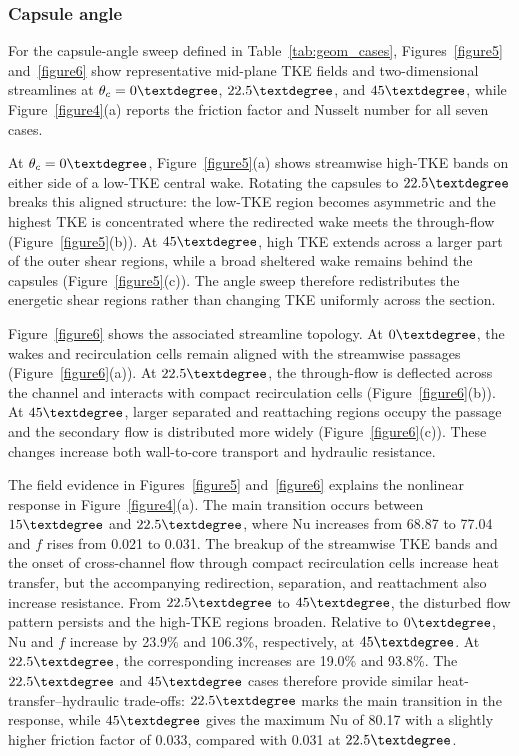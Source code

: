 \documentclass[energies,article,submit,moreauthors,noheaderline]{Definitions/mdpi}
\newcommand{\degree}{\texorpdfstring{\ensuremath{^\circ}}{\textdegree}}
\def\ensuremath#1{}%
\def\degree{\textdegree}%
\begin{document}
\subsubsection{Capsule angle}
\label{sec:disc_capsule_angle}

For the capsule-angle sweep defined in Table~\ref{tab:geom_cases}, Figures~\ref{figure5} and~\ref{figure6} show representative mid-plane TKE fields and two-dimensional streamlines at $\theta_c=0\degree$, $22.5\degree$, and $45\degree$, while Figure~\ref{figure4}(a) reports the friction factor and Nusselt number for all seven cases.

At $\theta_c=0\degree$, Figure~\ref{figure5}(a) shows streamwise high-TKE bands on either side of a low-TKE central wake. Rotating the capsules to $22.5\degree$ breaks this aligned structure: the low-TKE region becomes asymmetric and the highest TKE is concentrated where the redirected wake meets the through-flow (Figure~\ref{figure5}(b)). At $45\degree$, high TKE extends across a larger part of the outer shear regions, while a broad sheltered wake remains behind the capsules (Figure~\ref{figure5}(c)). The angle sweep therefore redistributes the energetic shear regions rather than changing TKE uniformly across the section.

Figure~\ref{figure6} shows the associated streamline topology. At $0\degree$, the wakes and recirculation cells remain aligned with the streamwise passages (Figure~\ref{figure6}(a)). At $22.5\degree$, the through-flow is deflected across the channel and interacts with compact recirculation cells (Figure~\ref{figure6}(b)). At $45\degree$, larger separated and reattaching regions occupy the passage and the secondary flow is distributed more widely (Figure~\ref{figure6}(c)). These changes increase both wall-to-core transport and hydraulic resistance.







The field evidence in Figures~\ref{figure5} and~\ref{figure6} explains the nonlinear response in Figure~\ref{figure4}(a). The main transition occurs between $15\degree$ and $22.5\degree$, where Nu increases from 68.87 to 77.04 and $f$ rises from 0.021 to 0.031. The breakup of the streamwise TKE bands and the onset of cross-channel flow through compact recirculation cells increase heat transfer, but the accompanying redirection, separation, and reattachment also increase resistance. From $22.5\degree$ to $45\degree$, the disturbed flow pattern persists and the high-TKE regions broaden. Relative to $0\degree$, Nu and $f$ increase by 23.9\% and 106.3\%, respectively, at $45\degree$. At $22.5\degree$, the corresponding increases are 19.0\% and 93.8\%. The $22.5\degree$ and $45\degree$ cases therefore provide similar heat-transfer--hydraulic trade-offs: $22.5\degree$ marks the main transition in the response, while $45\degree$ gives the maximum Nu of 80.17 with a slightly higher friction factor of 0.033, compared with 0.031 at $22.5\degree$.
\end{document}
